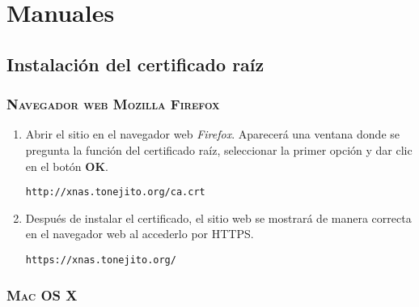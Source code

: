 {
  \linespread{1}
  \cleardoublepage  
  \appendix
  \chapter{Manuales}
  \label{apdx:a}
}

    \section {Instalaci\'{o}n del certificado ra\'{i}z}
    \label{sec:man-cert}


      \subsection {\textsc{Navegador web Mozilla Firefox}}
      \label{subsec:man-cert-firefox}

{
\linespread{0.1}
\begin{enumerate}

  \item Abrir el sitio en el navegador web \textsl{Firefox}. Aparecer\'{a} una ventana donde se pregunta la funci\'{o}n del certificado ra\'{iz}, seleccionar la primer opci\'{o}n y dar clic en el bot\'{o}n \textbf{OK}.

    \texttt{http://xnas.tonejito.org/ca.crt}


  \item Despu\'{e}s de instalar el certificado, el sitio web se mostrar\'{a} de manera correcta en el navegador web al accederlo por \textsc{HTTPS}.

    \texttt{https://xnas.tonejito.org/}


\end{enumerate}
}

      \subsection {\textsc{Mac OS X}}
      \label{subsec:man-cert-macosx}

